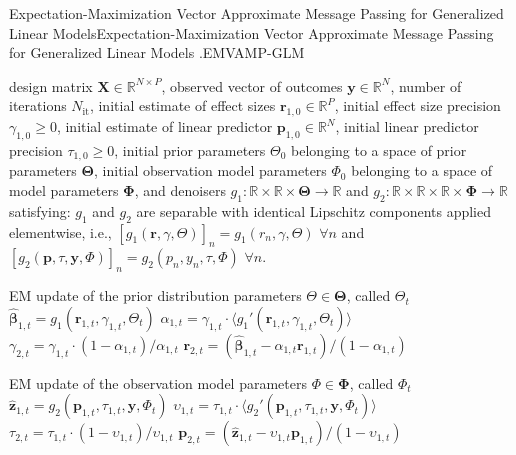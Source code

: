 \begin{breakablealgorithm}{Expectation-Maximization Vector Approximate Message Passing for Generalized Linear Models}{Expectation-Maximization Vector Approximate Message Passing for Generalized Linear Models \cite{schniter_vector_2016,emGVAMP2018}.}{EMVAMP-GLM}
    \begin{algorithmic}[1]
         design matrix $\bm{X} \in \mathbb{R}^{N \times P}$, observed vector of outcomes $\mathbf{y} \in \mathbb{R}^N$, number of iterations $N_{\text{it}}$, initial estimate of effect sizes $\bm{r}_{1,0} \in \mathbb{R}^P$, initial effect size precision $\gamma_{1,0} \ge 0$, initial estimate of linear predictor $\bm{p}_{1,0} \in \mathbb{R}^N$, initial linear predictor precision $\tau_{1,0} \ge 0$, initial prior parameters $\Theta_{0}$ belonging to a space of prior parameters $\bm{\Theta}$, initial observation model parameters $\Phi_{0}$ belonging to a space of model parameters $\bm{\Phi}$, and denoisers $g_1 : \mathbb{R} \times \mathbb{R} \times \bm{\Theta} \to \mathbb{R}$ and $g_2 : \mathbb{R} \times \mathbb{R} \times \mathbb{R} \times \bm{\Phi} \to \mathbb{R}$ satisfying: $g_1$ and $g_2$ are separable with identical Lipschitz components applied elementwise, i.e., $[g_1(\bm{r}, \gamma, \Theta)]_n = g_1(r_n, \gamma, \Theta)$ $\forall n$ and $[g_2(\bm{p}, \tau, \mathbf{y}, \Phi)]_n = g_2(p_n, y_n, \tau, \Phi)$ $\forall n$.

            \STATE EM update of the prior distribution parameters $\Theta \in \bm{\Theta}$, called $\Theta_t$
            \STATE $\hat{\bm{\beta}}_{1,t} = g_{1}(\bm{r}_{1,t}, \gamma_{1,t}, \Theta_t)$
            \STATE $\alpha_{1,t} = \gamma_{1,t} \cdot \langle g_{1}'(\bm{r}_{1,t}, \gamma_{1,t}, \Theta_t) \rangle$
            \STATE $\gamma_{2,t} = \gamma_{1,t} \cdot (1 - \alpha_{1,t}) / \alpha_{1,t}$
            \STATE $\bm{r}_{2,t} = (\hat{\bm{\beta}}_{1,t} - \alpha_{1,t} \bm{r}_{1,t}) / (1-\alpha_{1,t})$
            \item[]

            \STATE EM update of the observation model parameters $\Phi \in \bm{\Phi}$, called $\Phi_t$
            \STATE $\hat{\bm{z}}_{1,t} = g_{2}(\bm{p}_{1,t}, \tau_{1,t}, \mathbf{y}, \Phi_t)$
            \STATE $\upsilon_{1,t} = \tau_{1,t} \cdot \langle g_{2}'(\bm{p}_{1,t}, \tau_{1,t}, \mathbf{y}, \Phi_t) \rangle$
            \STATE $\tau_{2,t} = \tau_{1,t} \cdot (1 - \upsilon_{1,t}) / \upsilon_{1,t}$
            \STATE $\bm{p}_{2,t} = (\hat{\bm{z}}_{1,t} - \upsilon_{1,t} \bm{p}_{1,t}) / (1-\upsilon_{1,t})$
            \item[]


\end{algorithmic}
\end{breakablealgorithm}

